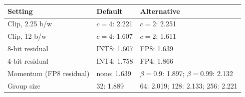 \begin{tabular}{lll}
\toprule
Setting & Default & Alternative \\
\midrule
Clip, 2.25 b/w & $c = 4$: 2.221 & $c = 2$: 2.251 \\
Clip, 12 b/w & $c = 4$: 1.607 & $c = 2$: 1.611 \\
8-bit residual & INT8: 1.607 & FP8: 1.639 \\
4-bit residual & INT4: 1.758 & FP4: 1.866 \\
Momentum (FP8 residual) & none: 1.639 & $\beta = 0.9$: 1.897; $\beta = 0.99$: 2.132 \\
Group size & 32: 1.889 & 64: 2.019; 128: 2.133; 256: 2.221 \\
\bottomrule
\end{tabular}
